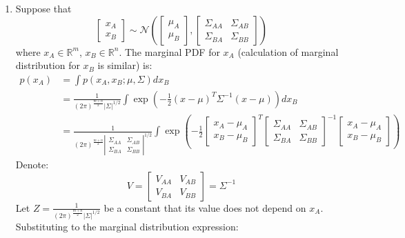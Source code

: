 \documentclass[a4paper, 10pt]{article}  %
\begin{document}
\begin{enumerate}[label=\textbf{(\alph*)}]
    \item Suppose that
    \[\left[ \begin{array}{c} x_A \\ x_B \end{array} \right] 
    \sim \mathcal{N} \left( \left[ \begin{array}{c} \mu_A \\ \mu_B \end{array} \right],
    \left[ \begin{array}{cc} \Sigma_{AA} & \Sigma_{AB}\\ \Sigma_{BA} & \Sigma_{BB}\end{array} \right]  \right)\]
    where $x_A \in \mathbb{R}^m$, $x_B \in \mathbb{R}^n$. The marginal PDF for $x_A$ (calculation of marginal distribution for $x_B$ is similar) is:
    \begin{align*}
        p(x_A) &= \int p(x_A, x_B; \mu, \Sigma)d x_B \\
        &= \frac{1}{(2 \pi)^{\frac{m + n}{2}} |\Sigma|^{1/2}} 
        \int \exp \left( -\frac{1}{2} (x - \mu)^T \Sigma^{-1} (x - \mu)\right) d x_B \\
        &= \frac{1}{(2 \pi)^{\frac{m + n}{2}} \left| \begin{array}{cc}
            \Sigma_{AA} & \Sigma_{AB} \\
            \Sigma_{BA} & \Sigma_{BB}
        \end{array}\right|^{1/2}} 
        \int \exp \left( -\frac{1}{2} \left[ \begin{array}{c} x_A - \mu_A \\ x_B - \mu_B \end{array} \right]^T \left[ \begin{array}{cc}
            \Sigma_{AA} & \Sigma_{AB} \\
            \Sigma_{BA} & \Sigma_{BB}
        \end{array} \right]^{-1} \left[ \begin{array}{c} x_A - \mu_A \\ x_B - \mu_B \end{array} \right]\right)
    \end{align*}
    Denote:
    \[V = \left[ \begin{array}{cc}
        V_{AA} & V_{AB} \\
        V_{BA} & V_{BB} \end{array} \right] = \Sigma^{-1}\]
    Let $\displaystyle{Z = \frac{1}{(2 \pi)^{\frac{m + n}{2}} |\Sigma|^{1/2}}}$ be a constant that its value does not depend on $x_A$. Substituting to the marginal distribution expression:

\end{enumerate}
\end{document}
